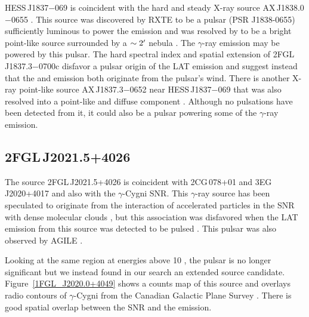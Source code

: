 \documentclass[12pt,preprint]{aastex}
\newcommand{\gev}{\text{GeV}\xspace}
\newcommand{\tev}{\text{TeV}\xspace}
\newcommand{\chandra}{\text{{\em Chandra}}\xspace}
\begin{document}
HESS\,J1837$-$069 is coincident with the hard and steady X-ray source
AX\,J1838.0$-$0655 \citep{hard_x-ray_asca}.  This source was discovered
by RXTE to be a pulsar (PSR J1838-0655) 
sufficiently luminous to power the \tev emission
and was resolved by \chandra to be a bright point-like source surrounded
by a $\sim2\mbox{$^\prime$}$ nebula \citep{pulsations_HESS_J1837-069}. The
$\gamma$-ray emission may be powered by this pulsar.  The hard spectral
index and spatial extension of 2FGL\,J1837.3$-$0700c disfavor a pulsar
origin of the LAT emission and suggest instead that the \gev and \tev
emission both originate from the pulsar's wind.  There is another
X-ray point-like source AX\,J1837.3$-$0652 near HESS\,J1837$-$069
\citep{hard_x-ray_asca} that was also resolved into a point-like
and diffuse component \citep{pulsations_HESS_J1837-069}.  Although no
pulsations have been detected from it, it could also be a pulsar powering
some of the $\gamma$-ray emission.


\subsection{2FGL\,J2021.5+4026}
\label{section_2FGL J2021.5+4026}





The source 2FGL\,J2021.5+4026 is coincident with 2CG\,078+01 and
3EG\,J2020+4017 \citep{second_cos_b_catalog,third_egret_catalog} and also
with the $\gamma$-Cygni SNR. This $\gamma$-ray source has been speculated
to originate from the interaction of accelerated particles in the SNR
with dense molecular clouds \citep{pollock_1985,gaisser_1998}, but this
association was disfavored when the LAT \gev emission from this source
was detected to be pulsed \citep[PSR\,J2021+4026,][]{first_lat_pulsar_cat}.
This pulsar was also observed by AGILE \citep{gamma_cygni_agile}.

Looking at the same region at energies above 10 \gev, the pulsar is
no longer significant but we instead found in our search an extended
source candidate.  Figure~\ref{1FGL_J2020.0+4049} shows a counts map
of this source and overlays radio contours of $\gamma$-Cygni from the
Canadian Galactic Plane Survey \citep{canadian_galactic_plane_survey}.
There is good spatial overlap between the SNR and the \gev emission.
\end{document}
